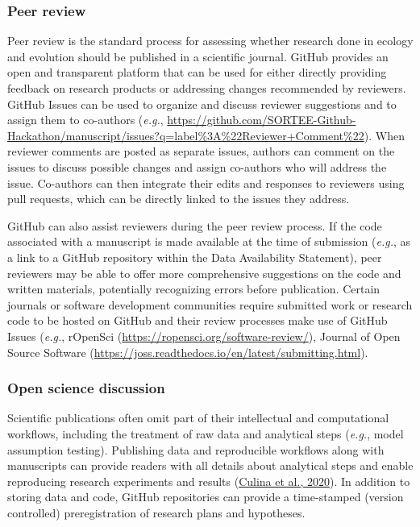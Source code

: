 \hypertarget{peer-review}{%
\subsubsection{Peer review}\label{peer-review}}

Peer review is the standard process for assessing whether research done in ecology and evolution should be published in a scientific journal.
GitHub provides an open and transparent platform that can be used for either directly providing feedback on research products or addressing changes recommended by reviewers.
GitHub Issues can be used to organize and discuss reviewer suggestions and to assign them to co-authors (\emph{e.g.}, \url{https://github.com/SORTEE-Github-Hackathon/manuscript/issues?q=label\%3A\%22Reviewer+Comment\%22}).
When reviewer comments are posted as separate issues, authors can comment on the issues to discuss possible changes and assign co-authors who will address the issue.
Co-authors can then integrate their edits and responses to reviewers using pull requests, which can be directly linked to the issues they address.

GitHub can also assist reviewers during the peer review process.
If the code associated with a manuscript is made available at the time of submission (\emph{e.g.}, as a link to a GitHub repository within the Data Availability Statement), peer reviewers may be able to offer more comprehensive suggestions on the code and written materials, potentially recognizing errors before publication.
Certain journals or software development communities require submitted work or research code to be hosted on GitHub and their review processes make use of GitHub Issues (\emph{e.g.}, rOpenSci (\url{https://ropensci.org/software-review/}), Journal of Open Source Software (\url{https://joss.readthedocs.io/en/latest/submitting.html}).

\hypertarget{open-science-discussion}{%
\subsubsection{Open science discussion}\label{open-science-discussion}}

Scientific publications often omit part of their intellectual and computational workflows, including the treatment of raw data and analytical steps (\emph{e.g.}, model assumption testing).
Publishing data and reproducible workflows along with manuscripts can provide readers with all details about analytical steps and enable reproducing research experiments and results (\protect\hyperlink{ref-NOgBWVAr}{Culina et al., 2020}).
In addition to storing data and code, GitHub repositories can provide a time-stamped (version controlled) preregistration of research plans and hypotheses.

